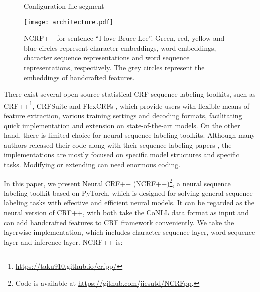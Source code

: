 \documentclass[11pt,a4paper]{article}
\begin{document}
\begin{figure}[!t]
\caption{Configuration file segment} 
  \label{fig:config} \end{figure}


\begin{figure*}[!t]
  \centering 
    \texttt{[image: architecture.pdf]}
  \caption{\textsc{NCRF++} for sentence ``I love Bruce Lee''. Green, red, yellow and blue circles represent character embeddings, word embeddings, character sequence representations and word sequence representations, respectively. The grey circles represent the embeddings of handcrafted features.} 
  \label{fig:architecture} \end{figure*}

There exist several open-source statistical CRF sequence labeling toolkits, such as CRF++\footnote{\url{https://taku910.github.io/crfpp/}}, CRFSuite \cite{okazaki2007crfsuite} and FlexCRFs \cite{phan2004flexcrfs}, which provide users with flexible means of feature extraction, various training settings and decoding formats, facilitating quick implementation and extension on state-of-the-art models. On the other hand, there is limited choice for neural sequence labeling toolkits. Although many authors released their code along with their sequence labeling papers \cite{lample2016neural,ma2016end,liu2017empower}, the implementations are mostly focused on specific model structures and specific tasks. Modifying or extending can need enormous coding.

In this paper, we present Neural CRF++ (NCRF++)\footnote{Code is available at \url{https://github.com/jiesutd/NCRFpp}.}, a neural sequence labeling toolkit based on PyTorch, which is designed for solving general sequence labeling tasks with effective and efficient neural models. It can be regarded as the neural version of CRF++, with both take the CoNLL data format as input and can add handcrafted features to CRF framework conveniently. We take the layer\-wise implementation, which includes character sequence layer, word sequence layer and inference layer. NCRF++ is:
\end{document}
